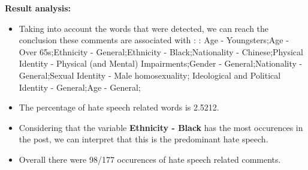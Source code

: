 \documentclass[11pt]{article}
\begin{document}
\textbf{\Large Result analysis:}

\begin{itemize}\item Taking into account the words that were detected, we can reach the conclusion these comments are associated with : : Age - Youngsters;Age - Over 65s;Ethnicity - General;Ethnicity - Black;Nationality - Chinese;Physical Identity - Physical (and Mental) Impairments;Gender - General;Nationality - General;Sexual Identity - Male homosexuality; Ideological and Political Identity - General;Age - General;%

\item The percentage of hate speech related words is 2.5212.

\item Considering that the variable \textbf{Ethnicity - Black} has the most occurences in the post, we can interpret that this is the predominant hate speech.

\item Overall there were 98/177 occurences of hate speech related comments.\end{itemize}
\end{document}
